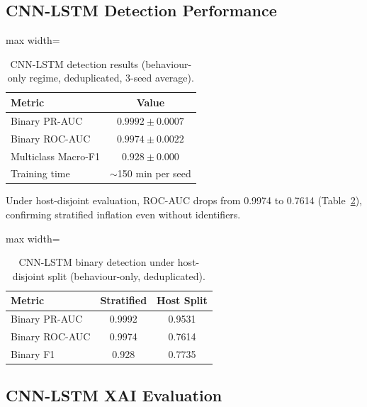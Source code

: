 \documentclass[12pt,a4paper]{report}
\begin{document}
\subsection{CNN-LSTM Detection Performance}
\label{sec:cnnlstm-detection}

\begin{table}[H]
\centering
\caption{CNN-LSTM detection results (behaviour-only regime, deduplicated, 3-seed average).}
\label{tab:cnnlstm}
\begin{adjustbox}{max width=\textwidth}
\begin{tabular}{lc}
\toprule
\textbf{Metric} & \textbf{Value} \\
\midrule
Binary PR-AUC & $0.9992 \pm 0.0007$ \\
Binary ROC-AUC & $0.9974 \pm 0.0022$ \\
Multiclass Macro-F1 & $0.928 \pm 0.000$ \\
Training time & $\sim$150 min per seed \\
\bottomrule
\end{tabular}
\end{adjustbox}
\end{table}

Under host-disjoint evaluation, ROC-AUC drops from 0.9974 to 0.7614 (Table~\ref{tab:cnnlstm-host}), confirming stratified inflation even without identifiers.

\begin{table}[H]
\centering
\caption{CNN-LSTM binary detection under host-disjoint split (behaviour-only, deduplicated).}
\label{tab:cnnlstm-host}
\begin{adjustbox}{max width=\textwidth}
\begin{tabular}{lcc}
\toprule
\textbf{Metric} & \textbf{Stratified} & \textbf{Host Split} \\
\midrule
Binary PR-AUC & 0.9992 & 0.9531 \\
Binary ROC-AUC & 0.9974 & 0.7614 \\
Binary F1 & 0.928 & 0.7735 \\
\bottomrule
\end{tabular}
\end{adjustbox}
\end{table}

\subsection{CNN-LSTM XAI Evaluation}
\label{sec:cnnlstm-xai}
\end{document}
